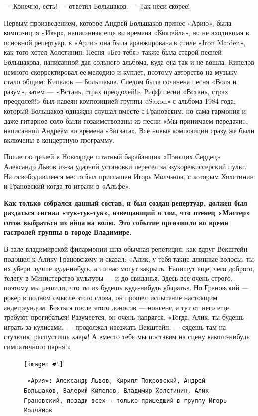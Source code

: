 \documentclass[16pt,a5paper]{book}
\newcommand{\myincludegraphics}[1]{\texttt{[image: \#1]}}
\begin{document}
— Конечно, есть! — ответил Большаков.
— Так неси скорее!

Первым произведением, которое Андрей Большаков принес «Арию», была композиция «Икар», написанная еще во времена
«Коктейля», но не входившая в основной репертуар. в «Арии» она была аранжирована в стиле «Iron Maiden», как того хотел
Холстинин. Песня «Без тебя» также была старой песней Большакова, написанной для сольного альбома, куда она так и не
вошла. Кипелов немного скорректировал ее мелодию и куплет, поэтому авторство на музыку стало общим: Кипелов — Большаков.
Следом была сочинена песня «Воля и разум», затем — «Встань, страх преодолей!». Рифф песни «Встань, страх преодолей!» был
навеян композицией группы «Saxon» с альбома 1984 года, который Большаков однажды слушал вместе с Грановским, но сама
гармония и даже гитарное соло были позаимствованы из песни «Мы принимаем передачи», написанной Андреем во времена
«Зигзага». Все новые композиции сразу же были включены в концертную программу.

После гастролей в Новгороде штатный барабанщик «Пoющих Сердец» Александр Львов из-за ударной установки пересел за
звукорежиссерский пульт. На освободившееся место был приглашен Игорь Молчанов, с которым Холстинин и Грановский когда-то
играли в «Альфе».

\textbf{Как только собрался данный состав, и был создан репертуар, должен был раздаться сигнал «тук-тук-тук», извещающий
о том, что птенец «Мастер» готов выбраться из яйца на волю. Это событие произошло во время гастролей группы в городе
Владимире.}

В зале владимирской филармонии шла обычная репетиция, как вдруг Векштейн подошел к Алику Грановскому и сказал: «Алик, у
тебя такие длинные волосы, ты их убери лучше куда-нибудь, а то нас могут закрыть. Напишут еще, чего доброго, телегу в
Министерство культуры — и до свиданья. Здесь все очень строго, поэтому мы решили, что ты их будешь куда-нибудь убирать».
Но Грановский — рокер в полном смысле этого слова, он прошел испытание настоящим андеграундом. Бояться после этого
доносов — нонсенс, а тут от него еще требуют прогибаться! Разумеется, он очень напрягся. «Тогда, Алик, ты будешь играть
за кулисами, — продолжал наезжать Векштейн, — сядешь там на стульчик, распустишь хаера! А вместо тебя мы поставим на
сцену какого-нибудь симпатичного парня!»

\begin{figure}[h]
    \centering
    \myincludegraphics{Image14}
    \caption{\texttt{
        «Ария»: Александр Львов, Кирилл Покровский, Андрей Большаков, Валерий Кипелов, Владимир Холстинин, Алик
        Грановский, позади всех - только пришедший в группу Игорь Молчанов
    }}
\end{figure}
\end{document}
